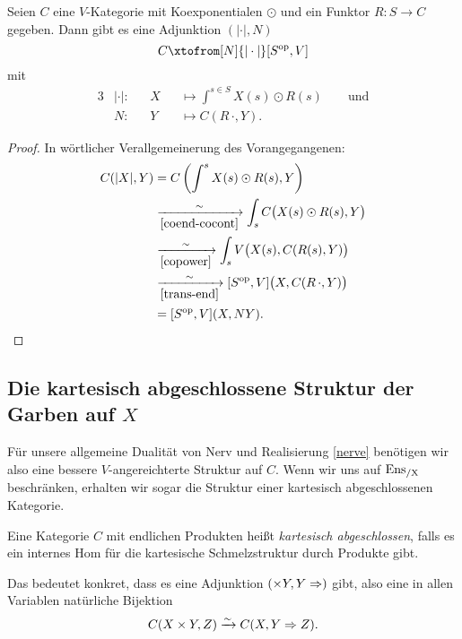 \begin{theorem} 
  \label{nerve}
  Seien $C$ eine $V$-Kategorie mit Koexponentialen $\odot$ und ein
  Funktor $R: S \to C$ gegeben. Dann gibt es eine Adjunktion
  $(|\cdot|, N)$
  \[ C \xtofrom[N]{|\cdot|} [S\op, V] \]
  mit
  \begin{alignat*}{3}
    &|\cdot|: && X &&\mapsto \int^{s \in S} X(s) \odot R(s) \qquad \text{und} \\
    &N: && Y &&\mapsto C(R \, \cdot, Y).
  \end{alignat*}
\end{theorem}
\begin{proof}
  In wörtlicher Verallgemeinerung des Vorangegangenen:
  \begin{align*}
     C(|X|, Y)
     &= C \left( \int^s X(s) \odot R(s), Y \right) \\
     & \xrightarrow[\ref{coend-cocont}]{\sim}
       \int_s C \big( X(s) \odot R(s), Y \big) \\
     & \xrightarrow[\ref{copower}]{\sim}
       \int_s V \big( X(s), C(R(s), Y) \big) \\
     & \xrightarrow[\ref{trans-end}]{\sim}
       [S^\mathrm{op}, V] \big( X, C(R \, \cdot, Y) \big) \\
     &= [S^\mathrm{op}, V] (X, NY).
  \end{align*}
\end{proof}

\subsection{Die kartesisch abgeschlossene Struktur der Garben auf $X$}

Für unsere allgemeine Dualität von Nerv und Realisierung \ref{nerve}
benötigen wir also eine bessere $V$-angereichterte Struktur auf
$C$. Wenn wir uns auf $\operatorname{Ens_{/X}}$ beschränken, erhalten wir sogar die
Struktur einer kartesisch abgeschlossenen Kategorie.
\begin{defn}
  Eine Kategorie $C$ mit endlichen Produkten heißt \emph{kartesisch
    abgeschlossen}, falls es ein internes Hom für die kartesische
  Schmelzstruktur durch Produkte gibt.
\end{defn}
Das bedeutet konkret, dass es eine Adjunktion $(\times Y, Y \Rightarrow)$
gibt, also eine in allen Variablen natürliche Bijektion
\[ C(X \times Y, Z) \xrightarrow[]{\sim} C(X, Y \Rightarrow Z). \]

